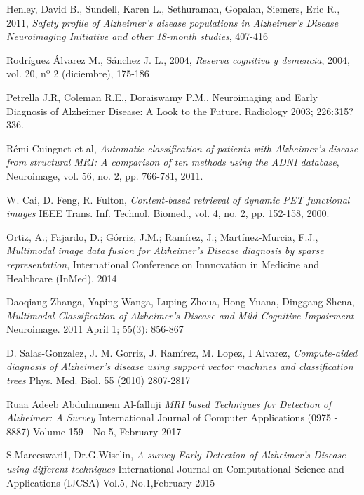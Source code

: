 \begin{thebibliography}{9}

	Henley, David B.,
	Sundell, Karen L.,
	Sethuraman, Gopalan,
 	Siemers, Eric R.,
	2011,	
	\textit{Safety profile of Alzheimer's disease populations in Alzheimer's Disease Neuroimaging 			Initiative and other 18-month studies},
 	407-416

	Rodríguez Álvarez M., Sánchez J. L.,
	2004,
	\textit{Reserva cognitiva y demencia},
	2004, vol. 20, nº 2 (diciembre), 175-186 
	
 Petrella J.R, Coleman R.E., Doraiswamy P.M., Neuroimaging and Early Diagnosis
of Alzheimer Disease: A Look to the Future. Radiology 2003; 226:315?336.



	Rémi Cuingnet et al, 
	\textit{Automatic classification of patients with Alzheimer's disease from
	structural MRI: A comparison of ten methods using the ADNI database},
	 Neuroimage,
	vol. 56, no. 2, pp. 766-781, 2011.

	W. Cai, 
	D. Feng, 
	R. Fulton, 
	\textit{Content-based retrieval of dynamic PET functional images} 
	IEEE Trans. Inf. Technol. Biomed., vol. 4, no. 2, pp. 152-158, 2000.

	Ortiz, A.; 
	Fajardo, D.; 
	Górriz, J.M.; 
	Ramírez, J.; 
	Martínez-Murcia, F.J.,
	\textit{Multimodal
image data fusion for Alzheimer's Disease diagnosis by sparse representation}, 
International Conference on Innnovation in Medicine and Healthcare (InMed), 2014


	Daoqiang Zhanga, 
	Yaping Wanga, 
	Luping Zhoua, 
	Hong Yuana, 
	Dinggang Shena,
	\textit{Multimodal Classification of Alzheimer's Disease and Mild Cognitive Impairment}
	Neuroimage. 2011 April 1; 55(3): 856-867


	D. Salas-Gonzalez, 
	J. M. Gorriz, 
	J. Ramírez, 
	M. Lopez, 
	I Alvarez,
	\textit{Compute-aided diagnosis of Alzheimer's disease using support vector machines and classification trees}
	Phys. Med. Biol. 55 (2010) 2807-2817


	Ruaa Adeeb Abdulmunem Al-falluji
	\textit{MRI based Techniques for Detection of Alzheimer: A Survey}
	International Journal of Computer Applications (0975 - 8887)
	Volume 159 - No 5, February 2017

	S.Mareeswari1, 
	Dr.G.Wiselin,
	\textit{A survey Early Detection of Alzheimer's Disease using different techniques}
	International Journal on Computational Science and Applications (IJCSA) Vol.5, No.1,February 2015


\end{thebibliography}
